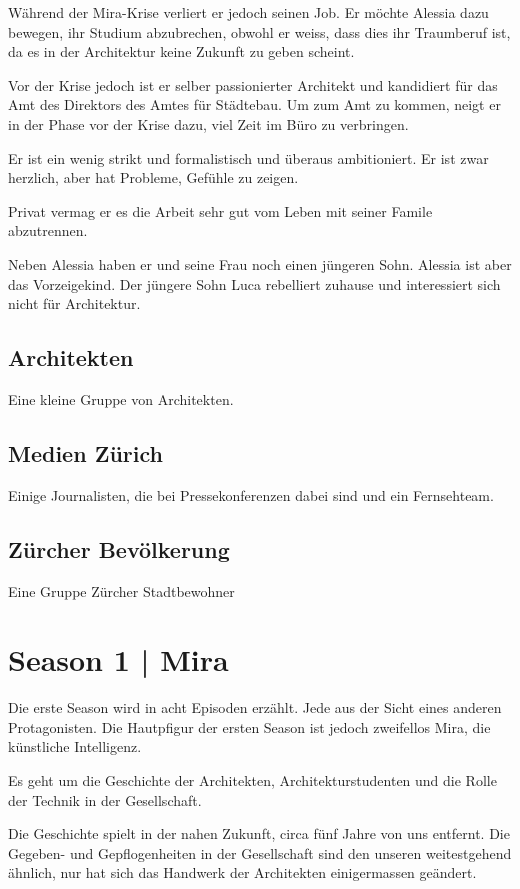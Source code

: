 \documentclass[11pt,a4paper,ngerman]{scrreprt}
\begin{document}
Während der Mira-Krise verliert er jedoch seinen Job. Er möchte Alessia dazu
bewegen, ihr Studium abzubrechen, obwohl er weiss, dass dies ihr Traumberuf
ist, da es in der Architektur keine Zukunft zu geben scheint.

Vor der Krise jedoch ist er selber passionierter Architekt und kandidiert für
das Amt des Direktors des Amtes für Städtebau. Um zum Amt zu kommen, neigt er
in der Phase vor der Krise dazu, viel Zeit im Büro zu verbringen.

Er ist ein wenig strikt und formalistisch und überaus ambitioniert.  Er ist
zwar herzlich, aber hat Probleme, Gefühle zu zeigen.

Privat vermag er es die Arbeit sehr gut vom Leben mit seiner Famile
abzutrennen.

Neben Alessia haben er und seine Frau noch einen jüngeren Sohn. Alessia ist
aber das Vorzeigekind. Der jüngere Sohn Luca rebelliert zuhause und
interessiert sich nicht für Architektur.

\section*{Architekten}

Eine kleine Gruppe von Architekten.

\section*{Medien Zürich}

Einige Journalisten, die bei Pressekonferenzen dabei sind und ein
Fernsehteam.

\section*{Zürcher Bevölkerung}

Eine Gruppe Zürcher Stadtbewohner

\chapter*{Season 1 | Mira}

Die erste Season wird in acht Episoden erzählt. Jede aus der Sicht eines
anderen Protagonisten. Die Hautpfigur der ersten Season ist jedoch zweifellos
Mira, die künstliche Intelligenz.

Es geht um die Geschichte der Architekten, Architekturstudenten und die Rolle
der Technik in der Gesellschaft.

Die Geschichte spielt in der nahen Zukunft, circa fünf Jahre von uns
entfernt. Die Gegeben- und Gepflogenheiten in der Gesellschaft sind den
unseren weitestgehend ähnlich, nur hat sich das Handwerk der Architekten
einigermassen geändert.
\end{document}
